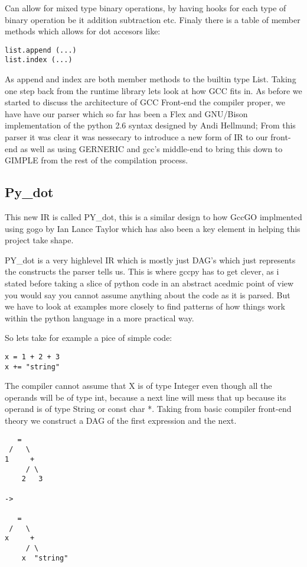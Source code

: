 \documentclass[defaultstyle,11pt]{article}
\begin{document}
Can allow for mixed type binary operations, by having hooks for each type of binary operation be it addition
subtraction etc. Finaly there is a table of member methods which allows for dot accesors like:

\begin{lstlisting}
list.append (...)
list.index (...)
\end{lstlisting}

As append and index are both member methods to the builtin type List. Taking one step back from the runtime library
lets look at how GCC fits in. As before we started to discuss the architecture of GCC Front-end the compiler proper,
we have have our parser which so far has been a Flex and GNU/Bison implementation of the python 2.6 syntax designed
by Andi Hellmund; From this parser it was clear it was nessecary to introduce a new form of IR to our front-end as
well as using GERNERIC and gcc's middle-end to bring this down to GIMPLE from the rest of the compilation process.

\subsection{Py\_dot}
This new IR is called PY\_dot, this is a similar design to how GccGO implmented using gogo by Ian Lance Taylor which
has also been a key element in helping this project take shape. 

PY\_dot is a very highlevel IR which is mostly just DAG's which just represents the constructs the parser tells us.
This is where gccpy has to get clever, as i stated before taking a slice of python code in an abstract acedmic point
of view you would say you cannot assume anything about the code as it is parsed. But we have to look at examples more
closely to find patterns of how things work within the python language in a more practical way.

So lets take for example a pice of simple code:

\begin{lstlisting}
x = 1 + 2 + 3
x += "string"
\end{lstlisting}

The compiler cannot assume that X is of type Integer even though all the operands will be of type int, because a next line
will mess that up because its operand is of type String or const char *. Taking from basic compiler front-end theory we
construct a DAG of the first expression and the next.

\begin{lstlisting}
   =
 /   \
1     +
     / \
    2   3

->

   =
 /   \
x     +
     / \
    x  "string"
\end{lstlisting}
\end{document}
